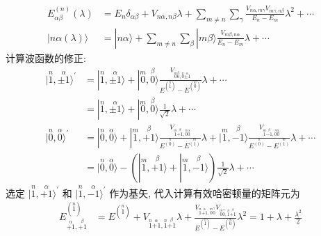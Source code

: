 \documentclass[../../main.tex]{subfiles}
\begin{document}
\begin{enumerate}
\begin{enumerate}
{{    \begin{align*}
      E^{(n)}_{\alpha\beta}(\lambda) &= E_{n}\delta_{\alpha\beta} + V_{n\alpha,n\beta}\lambda + \sum_{m\neq n}\sum_{\gamma}\frac{V_{n\alpha,m\gamma}V_{m\gamma,n\beta}}{E_{n}-E_{m}}\lambda^{2} + \cdots\\
      |n\alpha(\lambda)\rangle &= |n\alpha\rangle + \sum_{m\neq n}\sum_{\beta}|m\beta\rangle\frac{V_{m\beta,n\alpha}}{E_{n}-E_{m}}\lambda + \cdots
  \end{align*}
    计算波函数的修正:
    \begin{align*}
        |\stackrel{n}{1},\stackrel{\alpha}{\pm 1}\rangle^{\prime} &= |\stackrel{n}{1},\stackrel{\alpha}{\pm 1}\rangle 
        + |\stackrel{m}{0},\stackrel{\beta}{0}\rangle\frac{V_{\stackrel{m}{0}\stackrel{\beta}{0},\stackrel{n}{0}\stackrel{\alpha}{\pm 1}}}{E^{(\stackrel{n}{1})} - E^{(\stackrel{m}{0})}}\lambda + \cdots\\
        &= |\stackrel{n}{1},\stackrel{\alpha}{\pm 1}\rangle + |\stackrel{m}{0},\stackrel{\beta}{0}\rangle\frac{1}{\sqrt{2}}\lambda + \cdots\\
        |\stackrel{n}{0},\stackrel{\alpha}{0}\rangle^{\prime} &= |\stackrel{n}{0},\stackrel{\alpha}{0}\rangle
        + |\stackrel{m}{1},\stackrel{\beta}{+1}\rangle\frac{V_{\stackrel{m}{1}\stackrel{\beta}{+1}, \stackrel{n}{0}\stackrel{\alpha}{0}}}{E^{\stackrel{n}{(0)}} - E^{\stackrel{m}{(1)}}}\lambda
        + |\stackrel{m}{1},\stackrel{\beta}{-1}\rangle\frac{V_{\stackrel{m}{1}\stackrel{\beta}{-1}, \stackrel{n}{0}\stackrel{\alpha}{0}}}{E^{\stackrel{n}{(0)}} - E^{\stackrel{m}{(1)}}}\lambda + \cdots\\
        &= \boxed{|\stackrel{n}{0},\stackrel{\alpha}{0}\rangle
         - (|\stackrel{m}{1},\stackrel{\beta}{+1}\rangle + |\stackrel{m}{1},\stackrel{\beta}{-1}\rangle)\frac{1}{\sqrt{2}}\lambda} + \cdots
    \end{align*}
    选定 $|\stackrel{n}{1},\stackrel{\alpha}{+1}\rangle^{\prime}$ 和 $|\stackrel{n}{1},\stackrel{\alpha}{-1}\rangle^{\prime}$ 作为基矢, 代入计算有效哈密顿量的矩阵元为
    \begin{align*}
        E^{(\stackrel{n}{1})}_{\stackrel{\alpha}{+1},\stackrel{\beta}{+1}} &= 
        E^{(\stackrel{n}{1})} 
        + V_{\stackrel{n}{1}\stackrel{\alpha}{+1},\stackrel{n}{1}\stackrel{\beta}{+1}}\lambda 
        + \frac{V_{\stackrel{n}{1}\stackrel{\alpha}{+1},\stackrel{m}{0}\stackrel{\gamma}{0}}V_{\stackrel{m}{0}\stackrel{\gamma}{0},\stackrel{n}{1}\stackrel{\beta}{+1}}}{E^{(\stackrel{n}{1})} - E^{(\stackrel{m}{0})}}\lambda^{2} = 1 + \lambda + \frac{\lambda^{2}}{2}\\

\end{align*}}}
\end{enumerate}
\end{enumerate}
\end{document}
